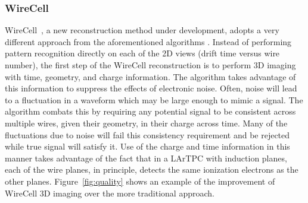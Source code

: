 \subsubsection{WireCell}

WireCell~\cite{wire-cell}, a new reconstruction method under development, adopts a very different approach from the aforementioned algorithms .
Instead of performing pattern recognition directly on each of the 2D views (drift 
time versus wire number), the first step of the WireCell reconstruction is to 
perform 3D imaging with time, geometry, and charge information. 
The algorithm takes advantage of this %
information to suppress the effects of electronic noise.
%
Often, noise will lead to a fluctuation in a waveform which may be
large enough to mimic a signal.  The algorithm combats this by
requiring any potential signal to be consistent across multiple wires,
given their geometry, in their charge across time.  Many of the
fluctuations due to noise will fail this consistency requirement and
be rejected while true signal will satisfy it.
%
Use of the charge and time information in this manner takes advantage of the fact that in a LArTPC with induction planes,
each of the wire planes, in principle, detects the same ionization electrons as the other planes. 
Figure~\ref{fig:quality} shows an example of the improvement of WireCell 3D imaging
over the more traditional approach. 

